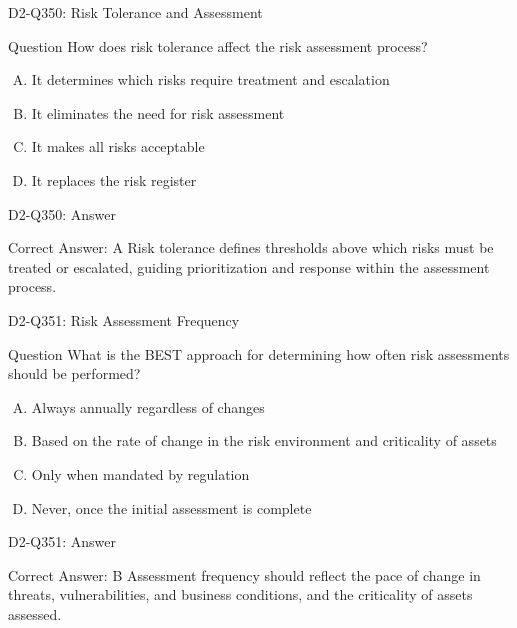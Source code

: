 \documentclass{beamer}
\begin{document}
\begin{frame}{D2-Q350: Risk Tolerance and Assessment}
	\begin{block}{Question}
		How does risk tolerance affect the risk assessment process?
	\end{block}
	\begin{enumerate}[(A)]
		\item It determines which risks require treatment and escalation
		\item It eliminates the need for risk assessment
		\item It makes all risks acceptable
		\item It replaces the risk register
	\end{enumerate}
\end{frame}
\begin{frame}{D2-Q350: Answer}
	\begin{block}{Correct Answer: A}
		Risk tolerance defines thresholds above which risks must be treated or escalated, guiding prioritization and response within the assessment process.
	\end{block}
\end{frame}

\begin{frame}{D2-Q351: Risk Assessment Frequency}
	\begin{block}{Question}
		What is the BEST approach for determining how often risk assessments should be performed?
	\end{block}
	\begin{enumerate}[(A)]
		\item Always annually regardless of changes
		\item Based on the rate of change in the risk environment and criticality of assets
		\item Only when mandated by regulation
		\item Never, once the initial assessment is complete
	\end{enumerate}
\end{frame}
\begin{frame}{D2-Q351: Answer}
	\begin{block}{Correct Answer: B}
		Assessment frequency should reflect the pace of change in threats, vulnerabilities, and business conditions, and the criticality of assets assessed.
	\end{block}
\end{frame}
\end{document}
